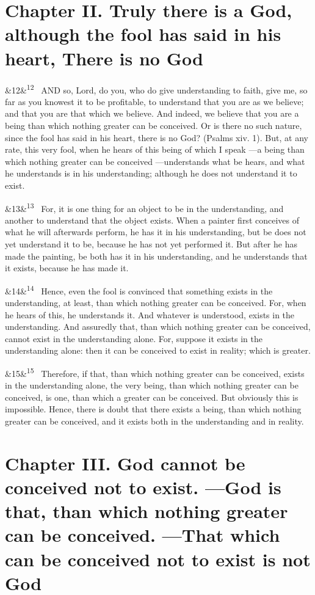 \documentclass[12pt]{article}
\newcommand{\para}[1][]{\par\noindent\ifx&#1&\else\textsuperscript{\footnotesize #1}~\fi}
\begin{document}
\section*{Chapter II. Truly there is a God, although the fool has said in his heart, There is no God}

\para[12] AND so, Lord, do you, who do give understanding to faith, give me, so far as you knowest it to be profitable, to understand that you are as we believe; and that you are that which we believe. And indeed, we believe that you are a being than which nothing greater can be conceived. Or is there no such nature, since the fool has said in his heart, there is no God? (Psalms xiv. 1). But, at any rate, this very fool, when he hears of this being of which I speak ---a being than which nothing greater can be conceived ---understands what be hears, and what he understands is in his understanding; although he does not understand it to exist.

\para[13] For, it is one thing for an object to be in the understanding, and another to understand that the object exists. When a painter first conceives of what he will afterwards perform, he has it in his understanding, but be does not yet understand it to be, because he has not yet performed it. But after he has made the painting, be both has it in his understanding, and he understands that it exists, because he has made it.

\para[14] Hence, even the fool is convinced that something exists in the understanding, at least, than which nothing greater can be conceived. For, when he hears of this, he understands it. And whatever is understood, exists in the understanding. And assuredly that, than which nothing greater can be conceived, cannot exist in the understanding alone. For, suppose it exists in the understanding alone: then it can be conceived to exist in reality; which is greater.

\para[15] Therefore, if that, than which nothing greater can be conceived, exists in the understanding alone, the very being, than which nothing greater can be conceived, is one, than which a greater can be conceived. But obviously this is impossible. Hence, there is doubt that there exists a being, than which nothing greater can be conceived, and it exists both in the understanding and in reality.


\section*{Chapter III. God cannot be conceived not to exist. ---God is that, than which nothing greater can be conceived. ---That which can be conceived not to exist is not God}
\end{document}

